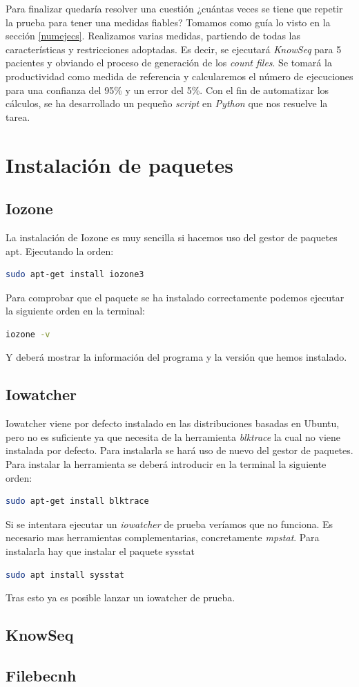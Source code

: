 Para finalizar quedaría resolver una cuestión ¿cuántas veces se tiene que repetir la prueba para tener una medidas fiables? Tomamos como guía lo visto en la sección \ref{numejecs}. Realizamos varias medidas, partiendo de todas las características y restricciones adoptadas. Es decir, se ejecutará \textit{KnowSeq} para 5 pacientes y obviando el proceso de generación de los \textit{count files}. Se tomará la productividad como medida de referencia y calcularemos el número de ejecuciones para una confianza del 95\% y un error del 5\%. Con el fin de automatizar los cálculos, se ha desarrollado un pequeño \textit{script} en \textit{Python} que nos resuelve la tarea.

\section{Instalación de paquetes}
\subsection{Iozone}
La instalación de Iozone es muy sencilla si hacemos uso del gestor de paquetes apt. Ejecutando la orden: 
\begin{lstlisting}[language=bash]
sudo apt-get install iozone3
\end{lstlisting}
Para comprobar que el paquete se ha instalado correctamente podemos ejecutar la siguiente orden en la terminal:
\begin{lstlisting}[language=bash]
iozone -v
\end{lstlisting}
Y deberá mostrar la información del programa y la versión que hemos instalado.

\subsection{Iowatcher}
Iowatcher viene por defecto instalado en las distribuciones basadas en Ubuntu, pero no es suficiente ya que necesita de la herramienta \textit{blktrace} la cual no viene instalada por defecto. Para instalarla se hará uso de nuevo del gestor de paquetes. Para instalar la herramienta se deberá introducir en la terminal la siguiente orden:
\begin{lstlisting}[language=bash]
sudo apt-get install blktrace
\end{lstlisting}
Si se intentara ejecutar un \textit{iowatcher} de prueba veríamos que no funciona. Es necesario mas herramientas complementarias, concretamente \textit{mpstat}. Para instalarla hay que instalar el paquete sysstat

\begin{lstlisting}[language=bash]
sudo apt install sysstat
\end{lstlisting}
Tras esto ya es posible lanzar un iowatcher de prueba.

\subsection{KnowSeq}
\subsection{Filebecnh}